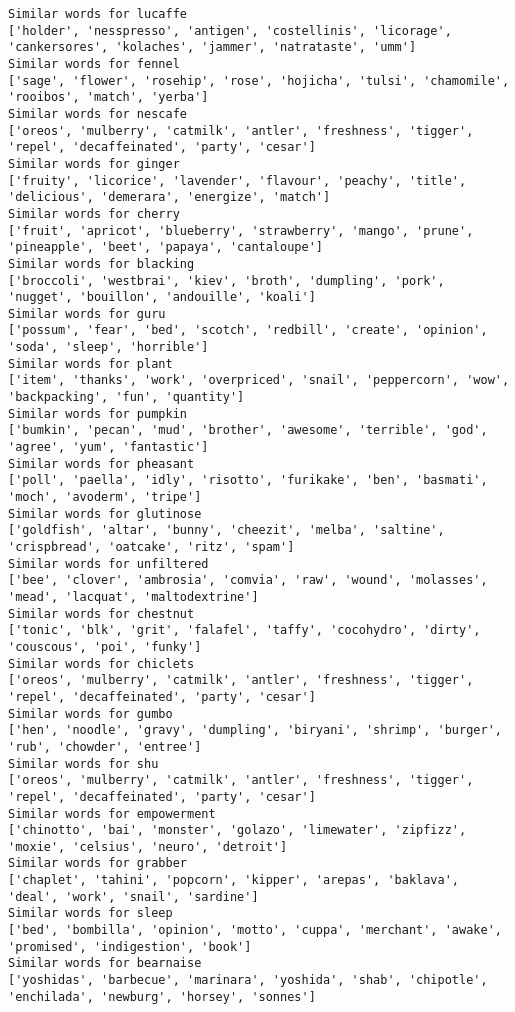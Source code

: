 \documentclass[11pt]{article}
\begin{document}
\begin{Verbatim}[commandchars=\\\{\}]
Similar words for lucaffe
['holder', 'nesspresso', 'antigen', 'costellinis', 'licorage', 'cankersores', 'kolaches', 'jammer', 'natrataste', 'umm']
Similar words for fennel
['sage', 'flower', 'rosehip', 'rose', 'hojicha', 'tulsi', 'chamomile', 'rooibos', 'match', 'yerba']
Similar words for nescafe
['oreos', 'mulberry', 'catmilk', 'antler', 'freshness', 'tigger', 'repel', 'decaffeinated', 'party', 'cesar']
Similar words for ginger
['fruity', 'licorice', 'lavender', 'flavour', 'peachy', 'title', 'delicious', 'demerara', 'energize', 'match']
Similar words for cherry
['fruit', 'apricot', 'blueberry', 'strawberry', 'mango', 'prune', 'pineapple', 'beet', 'papaya', 'cantaloupe']
Similar words for blacking
['broccoli', 'westbrai', 'kiev', 'broth', 'dumpling', 'pork', 'nugget', 'bouillon', 'andouille', 'koali']
Similar words for guru
['possum', 'fear', 'bed', 'scotch', 'redbill', 'create', 'opinion', 'soda', 'sleep', 'horrible']
Similar words for plant
['item', 'thanks', 'work', 'overpriced', 'snail', 'peppercorn', 'wow', 'backpacking', 'fun', 'quantity']
Similar words for pumpkin
['bumkin', 'pecan', 'mud', 'brother', 'awesome', 'terrible', 'god', 'agree', 'yum', 'fantastic']
Similar words for pheasant
['poll', 'paella', 'idly', 'risotto', 'furikake', 'ben', 'basmati', 'moch', 'avoderm', 'tripe']
Similar words for glutinose
['goldfish', 'altar', 'bunny', 'cheezit', 'melba', 'saltine', 'crispbread', 'oatcake', 'ritz', 'spam']
Similar words for unfiltered
['bee', 'clover', 'ambrosia', 'comvia', 'raw', 'wound', 'molasses', 'mead', 'lacquat', 'maltodextrine']
Similar words for chestnut
['tonic', 'blk', 'grit', 'falafel', 'taffy', 'cocohydro', 'dirty', 'couscous', 'poi', 'funky']
Similar words for chiclets
['oreos', 'mulberry', 'catmilk', 'antler', 'freshness', 'tigger', 'repel', 'decaffeinated', 'party', 'cesar']
Similar words for gumbo
['hen', 'noodle', 'gravy', 'dumpling', 'biryani', 'shrimp', 'burger', 'rub', 'chowder', 'entree']
Similar words for shu
['oreos', 'mulberry', 'catmilk', 'antler', 'freshness', 'tigger', 'repel', 'decaffeinated', 'party', 'cesar']
Similar words for empowerment
['chinotto', 'bai', 'monster', 'golazo', 'limewater', 'zipfizz', 'moxie', 'celsius', 'neuro', 'detroit']
Similar words for grabber
['chaplet', 'tahini', 'popcorn', 'kipper', 'arepas', 'baklava', 'deal', 'work', 'snail', 'sardine']
Similar words for sleep
['bed', 'bombilla', 'opinion', 'motto', 'cuppa', 'merchant', 'awake', 'promised', 'indigestion', 'book']
Similar words for bearnaise
['yoshidas', 'barbecue', 'marinara', 'yoshida', 'shab', 'chipotle', 'enchilada', 'newburg', 'horsey', 'sonnes']

\end{Verbatim}
\end{document}
